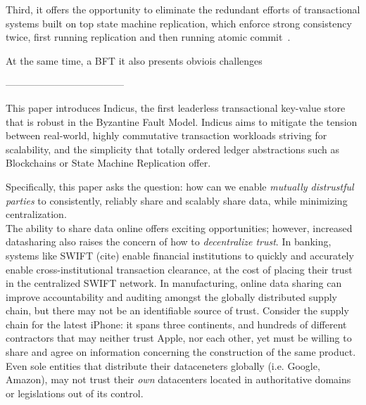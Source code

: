 Third, it offers the opportunity to eliminate the redundant efforts of
transactional systems built on top state machine replication, which
enforce strong consistency twice, first running replication and then
running atomic commit~\cite{}.

At the same time, a BFT it also presents obviois challenges



------------------------------------



This paper introduces Indicus, the first leaderless transactional key-value store that is robust in the Byzantine Fault Model. Indicus aims to mitigate the tension between real-world, highly commutative transaction workloads striving for scalability, and the simplicity that totally ordered ledger abstractions such as Blockchains or State Machine Replication offer.

 Specifically, this paper asks the question: how can we enable \textit{mutually distrustful parties} to consistently, reliably share and scalably share data, while minimizing centralization. \\


The ability to share data online offers exciting opportunities; however, increased datasharing also raises the concern of how to \textit{decentralize trust}. In banking, systems like SWIFT (cite) enable financial institutions to quickly and accurately enable cross-institutional transaction clearance, at the cost of placing their trust in the centralized SWIFT network. In manufacturing, online data sharing can improve accountability and auditing amongst the globally distributed supply chain, but there may not be an identifiable source of trust. Consider the supply chain for the latest iPhone: it spans three continents, and hundreds of different contractors \cite{AppleSup} that may neither trust Apple, nor each other, yet must be willing to share and agree on information concerning the construction of the same product. Even sole entities that distribute their dataceneters globally (i.e. Google, Amazon), may not trust their \textit{own} datacenters located in authoritative domains or legislations out of its control.\\



